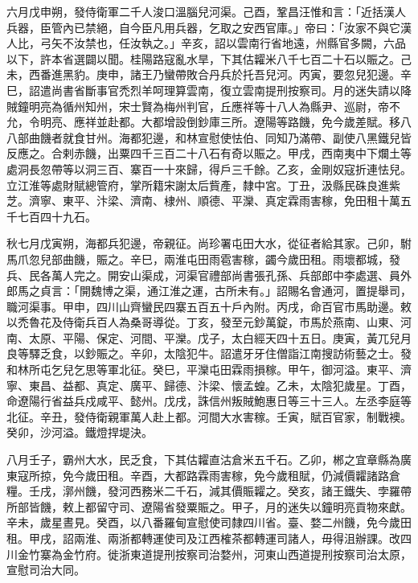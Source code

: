 \begin{pinyinscope}
 六月戊申朔，發侍衛軍二千人浚口溫腦兒河渠。己酉，鞏昌汪惟和言：「近括漢人兵器，臣管內已禁絕，自今臣凡用兵器，乞取之安西官庫。」帝曰：「汝家不與它漢人比，弓矢不汝禁也，任汝執之。」辛亥，詔以雲南行省地遠，州縣官多闕，六品以下，許本省選闢以聞。桂陽路寇亂水旱，下其估糶米八千七百二十石以賑之。己未，西番進黑豹。庚申，諸王乃蠻帶敗合丹兵於托吾兒河。丙寅，要忽兒犯邊。辛巳，詔遣尚書省斷事官禿烈羊呵理算雲南，復立雲南提刑按察司。月的迷失請以降賊鐘明亮為循州知州，宋士賢為梅州判官，丘應祥等十八人為縣尹、巡尉，帝不允，令明亮、應祥並赴都。大都增設倒鈔庫三所。遼陽等路饑，免今歲差賦。移八八部曲饑者就食甘州。海都犯邊，和林宣慰使怯伯、同知乃滿帶、副使八黑鐵兒皆反應之。合剌赤饑，出粟四千三百二十八石有奇以賑之。甲戌，西南夷中下爛土等處洞長忽帶等以洞三百、寨百一十來歸，得戶三千餘。乙亥，金剛奴寇折連怯兒。立江淮等處財賦總管府，掌所籍宋謝太后貲產，隸中宮。丁丑，汲縣民硃良進紫芝。濟寧、東平、汴梁、濟南、棣州、順德、平灤、真定霖雨害稼，免田租十萬五千七百四十九石。



 秋七月戊寅朔，海都兵犯邊，帝親征。尚珍署屯田大水，從征者給其家。己卯，駙馬爪忽兒部曲饑，賑之。辛巳，兩淮屯田雨雹害稼，蠲今歲田租。雨壞都城，發兵、民各萬人完之。開安山渠成，河渠官禮部尚書張孔孫、兵部郎中李處選、員外郎馬之貞言：「開魏博之渠，通江淮之運，古所未有。」詔賜名會通河，置提舉司，職河渠事。甲申，四川山齊蠻民四寨五百五十戶內附。丙戌，命百官市馬助邊。敕以禿魯花及侍衛兵百人為桑哥導從。丁亥，發至元鈔萬錠，市馬於燕南、山東、河南、太原、平陽、保定、河間、平灤。戊子，太白經天四十五日。庚寅，黃兀兒月良等驛乏食，以鈔賑之。辛卯，太陰犯牛。詔遣牙牙住僧詣江南搜訪術藝之士。發和林所屯乞兒乞思等軍北征。癸巳，平灤屯田霖雨損稼。甲午，御河溢。東平、濟寧、東昌、益都、真定、廣平、歸德、汴梁、懷孟蝗。乙未，太陰犯歲星。丁酉，命遼陽行省益兵戍咸平、懿州。戊戌，誅信州叛賊鮑惠日等三十三人。左丞李庭等北征。辛丑，發侍衛親軍萬人赴上都。河間大水害稼。壬寅，賦百官家，制戰襖。癸卯，沙河溢。鐵燈捍堤決。



 八月壬子，霸州大水，民乏食，下其估糶直沽倉米五千石。乙卯，郴之宜章縣為廣東寇所掠，免今歲田租。辛酉，大都路霖雨害稼，免今歲租賦，仍減價糶諸路倉糧。壬戌，漷州饑，發河西務米二千石，減其價賑糶之。癸亥，諸王鐵失、孛羅帶所部皆饑，敕上都留守司、遼陽省發粟賑之。甲子，月的迷失以鐘明亮貢物來獻。辛未，歲星晝見。癸酉，以八番羅甸宣慰使司隸四川省。臺、婺二州饑，免今歲田租。甲戌，詔兩淮、兩浙都轉運使司及江西榷茶都轉運司諸人，毋得沮辦課。改四川金竹寨為金竹府。徙浙東道提刑按察司治婺州，河東山西道提刑按察司治太原，宣慰司治大同。




\end{pinyinscope}
